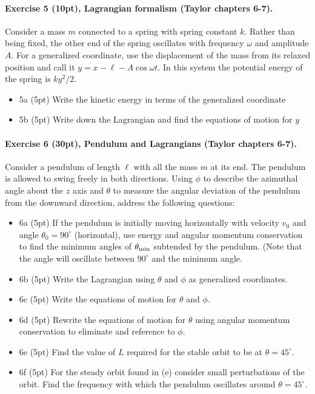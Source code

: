 \documentclass[%
oneside,                 %
final,                   %
10pt]{article}
\begin{document}
\paragraph{Exercise 5 (10pt), Lagrangian formalism (Taylor chapters 6-7).}
Consider a mass $m$ connected to a spring with spring constant $k$. Rather than being fixed, the other end of the spring oscillates with frequency $\omega$ and amplitude $A$. For a generalized coordinate, use the displacement of the mass from its relaxed position and call it $y=x-\ell-A\cos\omega t$. In this system the potential energy of the spring is $ky^2/2$.

\begin{itemize}
\item 5a (5pt) Write the kinetic energy in terms of the generalized coordinate

\item 5b (5pt) Write down the Lagrangian and find the equations of motion for $y$
\end{itemize}

\noindent
\paragraph{Exercise 6 (30pt), Pendulum and Lagrangians (Taylor chapters 6-7).}
Consider a pendulum of length $\ell$ with all the mass $m$ at its end. The pendulum is allowed to swing freely in both directions. Using $\phi$ to describe the azimuthal angle about the $z$ axis and $\theta$ to measure the angular deviation of the pendulum from the downward direction, address the following questions:

\begin{itemize}
\item 6a (5pt) If the pendulum is initially moving horizontally with velocity $v_0$ and angle $\theta_0=90^\circ$ (horizontal), use energy and angular momentum conservation to find the minimum angles of $\theta_{\rm min}$ subtended by the pendulum. (Note that the angle  will oscillate between $90^\circ$ and the minimum angle.

\item 6b (5pt) Write the Lagrangian using $\theta$ and $\phi$ as generalized coordinates.

\item 6c (5pt) Write the equations of motion for $\theta$ and $\phi$.

\item 6d (5pt) Rewrite the equations of motion for $\theta$ using angular momentum conservation to eliminate and reference to $\phi$.

\item 6e (5pt) Find the value of $L$ required for the stable orbit to be at $\theta=45^\circ$.

\item 6f (5pt)  For the steady orbit found in (e) consider small perturbations of the orbit. Find the frequency with which the pendulum oscillates around $\theta=45^\circ$.
\end{itemize}

\noindent

\end{document}
